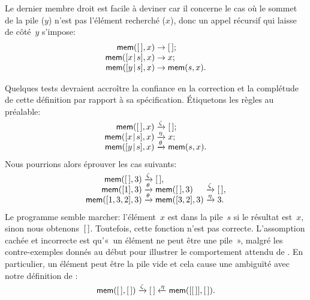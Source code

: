 Le dernier membre droit est facile à deviner car il concerne le cas où
le sommet de la pile (\(y\)) n'est pas l'élément recherché (\(x\)),
donc un appel récursif qui laisse de côté~\(y\) s'impose:
\begin{equation*}
\begin{array}{r@{\;}c@{\;}l}
\fun{mem}(\el,x) & \rightarrow & \el;\\
\fun{mem}(\cons{x}{s},x) & \rightarrow & x;\\
\fun{mem}(\cons{y}{s},x) & \rightarrow & \fun{mem}(s,x).
\end{array}
\end{equation*}

Quelques tests devraient accroître la confiance en la
correction et la complétude de
cette définition par rapport à sa spécification. Étiquetons les règles
au préalable:
\begin{equation*}
\begin{array}{r@{\;}c@{\;}l}
\fun{mem}(\el,x)         & \smashedrightarrow{\zeta}  & \el;\\
\fun{mem}(\cons{x}{s},x) & \smashedrightarrow{\eta}   & x;\\
\fun{mem}(\cons{y}{s},x) & \smashedrightarrow{\theta} &
\fun{mem}(s,x).
\end{array}
\end{equation*}
Nous pourrions alors éprouver les cas suivants:
\begin{equation*}
\begin{array}{r@{\;}l@{\;}l@{\;}l@{\;}l}
\fun{mem}(\el,3) & \smashedrightarrow{\zeta} & \el,\\
\fun{mem}([1],3) & \smashedrightarrow{\theta} & \fun{mem}(\el,3)
& \smashedrightarrow{\zeta} & \el,\\
\fun{mem}([1,3,2],3) & \smashedrightarrow{\theta} & \fun{mem}([3,2],3)
& \smashedrightarrow{\eta} & 3.
\end{array}
\end{equation*}
Le programme semble marcher: l'élément~\(x\) est dans la pile~\(s\) si
le résultat est~\(x\), sinon nous obtenons~\([\,]\). Toutefois, cette
fonction n'est pas correcte. L'assomption cachée et
incorrecte est qu'«~un élément ne peut être une pile~», malgré les
contre-exemples donnés au début pour illustrer le comportement attendu
de . En particulier, un élément peut être la pile vide et
cela cause une ambiguïté avec notre définition de :
\begin{equation*}
  \textsf{mem}([\,],[\,]) \xrightarrow{\smash{\zeta}} [\,] \xleftarrow{\smash{\eta}} \textsf{mem}([[\,]],[\,]).
\end{equation*}
